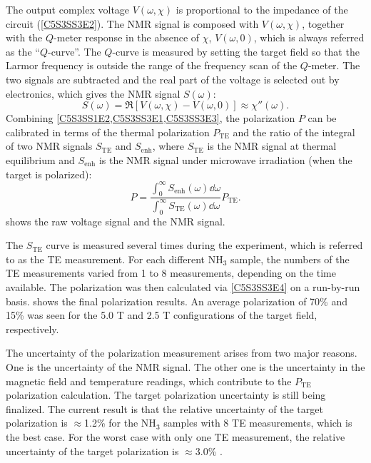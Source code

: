 The output complex voltage $V(\omega,\chi)$ is proportional to the impedance of the circuit (\cref{C5S3SS3E2}). The NMR signal is composed with $V(\omega,\chi)$, together with the $Q$-meter response in the absence of $\chi$, $V(\omega,0)$, which is always referred as the ``$Q$-curve''. The $Q$-curve is measured by setting the target field so that the Larmor frequency is outside the range of the frequency scan of the $Q$-meter. The two signals are subtracted and the real part of the voltage is selected out by electronics, which gives the NMR signal $S(\omega)$:
\begin{equation} \label{C5S3SS3E3}
S(\omega) = \Re[V(\omega,\chi)-V(\omega,0)]\approx\chi''(\omega).
\end{equation}
Combining \cref{C5S3SS1E2,C5S3SS3E1,C5S3SS3E3}, the polarization $P$ can be calibrated in terms of the thermal polarization $P_{\mathrm{TE}}$ and the ratio of the integral of two NMR signals $S_{\mathrm{TE}}$ and $S_{\mathrm{enh}}$, where $S_{\mathrm{TE}}$ is the NMR signal at thermal equilibrium and $S_{\mathrm{enh}}$ is the NMR signal under microwave irradiation (when the target is polarized):
\begin{equation} \label{C5S3SS3E4}
P = \frac{\int_0^\infty S_{\mathrm{enh}}(\omega)\dd{\omega}}{\int_0^\infty S_{\mathrm{TE}}(\omega)\dd{\omega}}P_{\mathrm{TE}}.
\end{equation}
 shows the raw voltage signal and the NMR signal.

The $S_{\mathrm{TE}}$ curve is measured several times during the experiment, which is referred to as the TE measurement. For each different NH${}_3$ sample, the numbers of the TE measurements varied from 1 to 8 measurements, depending on the time available. The polarization was then calculated via \cref{C5S3SS3E4} on a run-by-run basis.  shows the final polarization results. An average polarization of 70\% and 15\% was seen for the 5.0 T and 2.5 T configurations of the target field, respectively.

The uncertainty of the polarization measurement arises from two major reasons. One is the uncertainty of the NMR signal. The other one is the uncertainty in the magnetic field and temperature readings, which contribute to the $P_{\mathrm{TE}}$ polarization calculation. The target polarization uncertainty is still being finalized. The current result is that the relative uncertainty of the target polarization is $\approx$1.2\% for the NH${}_3$ samples with 8 TE measurements, which is the best case. For the worst case with only one TE measurement, the relative uncertainty of the target polarization is $\approx$3.0\% \cite{Badman2013}.

